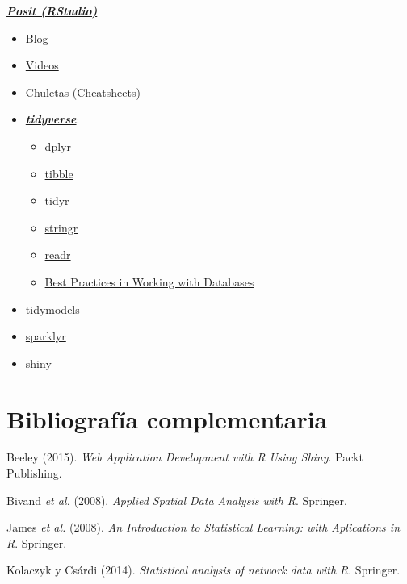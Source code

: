 \documentclass[
]{book}
\theoremstyle{break}
\theoremstyle{nonumberplain}
\begin{document}
\href{https://posit.co}{\textbf{\emph{Posit (RStudio)}}}

\begin{itemize}
\item
  \href{https://posit.co/blog}{Blog}
\item
  \href{https://posit.co/resources/videos}{Videos}
\item
  \href{https://posit.co/resources/cheatsheets}{Chuletas (Cheatsheets)}
\item
  \href{https://www.tidyverse.org/}{\textbf{\emph{tidyverse}}}:

  \begin{itemize}
  \item
    \href{https://dplyr.tidyverse.org}{dplyr}
  \item
    \href{https://tibble.tidyverse.org}{tibble}
  \item
    \href{https://tidyr.tidyverse.org}{tidyr}
  \item
    \href{https://stringr.tidyverse.org}{stringr}
  \item
    \href{https://readr.tidyverse.org}{readr}
  \item
    \href{https://solutions.posit.co/connections/db}{Best Practices in Working with Databases}
  \end{itemize}
\item
  \href{https://www.tidymodels.org}{tidymodels}
\item
  \href{https://spark.rstudio.com/}{sparklyr}
\item
  \href{http://shiny.rstudio.com}{shiny}
\end{itemize}

\hypertarget{bibliografuxeda-complementaria}{%
\section*{Bibliografía complementaria}\label{bibliografuxeda-complementaria}}

Beeley (2015). \emph{Web Application Development with R Using Shiny}.
Packt Publishing.

Bivand \emph{et al.} (2008). \emph{Applied Spatial Data Analysis with R}. Springer.

James \emph{et al.} (2008). \emph{An Introduction to Statistical Learning: with
Aplications in R}. Springer.

Kolaczyk y Csárdi (2014). \emph{Statistical analysis of network data with R}. Springer.
\end{document}

